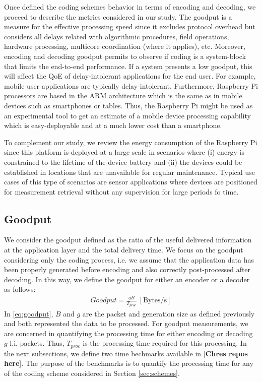 \label{sec:metrics}

Once defined the coding schemes behavior in terms of encoding
and decoding, we proceed to describe the metrics considered in our study.
The goodput is a measure for the effective processing speed since it
excludes protocol overhead but considers all delays related with
algorithmic procedures, field operations, hardware processing, multicore
coordination (where it applies), etc. Moreover, encoding and decoding
goodput permits to observe if coding is a system-block that limits the
end-to-end performance. If a system presents a low goodput, this will
affect the \ac{QoE} of delay-intolerant applications for the end user.
For example, mobile user applications are typically delay-intolerant.
Furthermore, Raspberry Pi processors are based in the \ac{ARM} architecture
which is the same as in mobile devices such as smartphones or tables.
Thus, the Raspberry Pi might be used as an experimental tool to get an
estimate of a mobile device processing capability which is easy-deployable
and at a much lower cost than a smartphone.

To complement our study, we review the energy consumption of the Raspberry
Pi since this platform is deployed at a large scale in scenarios where (i)
energy is constrained to the lifetime of the device battery and (ii) the
devices could be established in locations that are unavailable for
regular maintenance. Typical use cases of this type of scenarios are
sensor applications where devices are positioned for measurement retrieval
without any supervision for large periods fo time.

\subsection{Goodput}
We consider the goodput defined as the ratio of the useful delivered
information at the application layer and the total delivery time. We focus
on the goodput considering only the coding process, i.e. we assume that
the application data has been properly generated before encoding and
also correctly post-processed after decoding. In this way, we define
the goodput for either an encoder or a decoder as follows:
%
\begin{align} \label{eq:goodput}
Goodput = \frac{gB}{T_{proc}} ~ [\mathrm{Bytes/s}]
\end{align}
%
In \eqref{eq:goodput}, $B$ and $g$ are the packet and generation size
as defined previously and both represented the data to be processed. For
goodput measurements, we are concerned in quantifying the processing time
for either encoding or decoding $g$ \ac{l.i.} packets. Thus, $T_{proc}$ is
the processing time required for this processing. In the next subsections, we
define two time bechmarks available in [\textbf{Chres repos here}].
The purpose of the benchmarks is to quantify the processing time for
any of the coding scheme considered in Section \ref{sec:schemes}.

